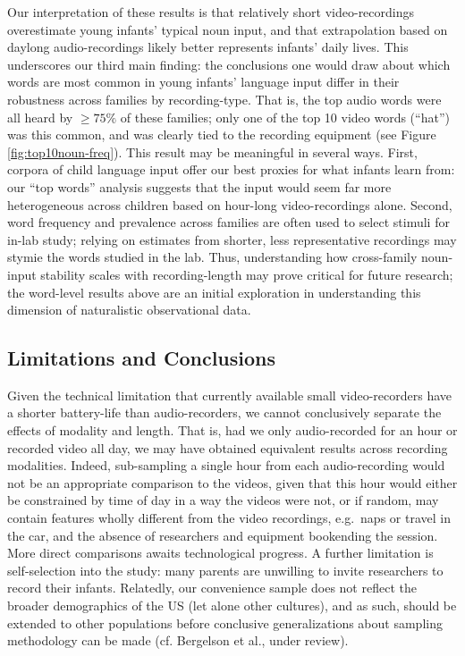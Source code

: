 \documentclass[man]{apa6}
\theoremstyle{definition}
\theoremstyle{definition}
\theoremstyle{definition}
\theoremstyle{remark}
\begin{document}
Our interpretation of these results is that relatively short
video-recordings overestimate young infants' typical noun input, and
that extrapolation based on daylong audio-recordings likely better
represents infants' daily lives. This underscores our third main
finding: the conclusions one would draw about which words are most
common in young infants' language input differ in their robustness
across families by recording-type. That is, the top audio words were all
heard by \(\geq75\%\) of these families; only one of the top 10 video
words (\enquote{hat}) was this common, and was clearly tied to the
recording equipment (see Figure \ref{fig:top10noun-freq}). This result
may be meaningful in several ways. First, corpora of child language
input offer our best proxies for what infants learn from: our
\enquote{top words} analysis suggests that the input would seem far more
heterogeneous across children based on hour-long video-recordings alone.
Second, word frequency and prevalence across families are often used to
select stimuli for in-lab study; relying on estimates from shorter, less
representative recordings may stymie the words studied in the lab. Thus,
understanding how cross-family noun-input stability scales with
recording-length may prove critical for future research; the word-level
results above are an initial exploration in understanding this dimension
of naturalistic observational data.

\subsection{Limitations and
Conclusions}\label{limitations-and-conclusions}

Given the technical limitation that currently available small
video-recorders have a shorter battery-life than audio-recorders, we
cannot conclusively separate the effects of modality and length. That
is, had we only audio-recorded for an hour or recorded video all day, we
may have obtained equivalent results across recording modalities.
Indeed, sub-sampling a single hour from each audio-recording would not
be an appropriate comparison to the videos, given that this hour would
either be constrained by time of day in a way the videos were not, or if
random, may contain features wholly different from the video recordings,
e.g.~naps or travel in the car, and the absence of researchers and
equipment bookending the session. More direct comparisons awaits
technological progress. A further limitation is self-selection into the
study: many parents are unwilling to invite researchers to record their
infants. Relatedly, our convenience sample does not reflect the broader
demographics of the US (let alone other cultures), and as such, should
be extended to other populations before conclusive generalizations about
sampling methodology can be made (cf. Bergelson et al., under review).
\end{document}
